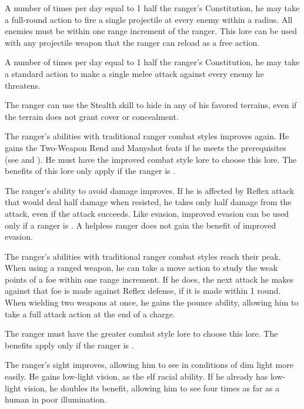  A number of times per day equal to 1 \add half the ranger's Constitution, he may take a full-round action to fire a single projectile at every enemy within a \areamed radius. All enemies must be within one range increment of the ranger. This lore can be used with any projectile weapon that the ranger can reload as a free action.

 A number of times per day equal to 1 \add half the ranger's Constitution, he may take a standard action to make a single melee attack against every enemy he threatens.

\label{Camouflage} The ranger can use the Stealth skill to hide in any of his favored terrains, even if the terrain does not grant cover or concealment.

 The ranger's abilities with traditional ranger combat styles improves again. He gains the Two-Weapon Rend and Manyshot feats if he meets the prerequisites (see  and ). He must have the improved combat style lore to choose this lore. The benefits of this lore only apply if the ranger is \unencumbered.

 The ranger's ability to avoid damage improves. If he is affected by Reflex attack that would deal half damage when resisted, he takes only half damage from the attack, even if the attack succeeds. Like evasion, improved evasion can be used only if a ranger is \unencumbered. A helpless ranger does not gain the benefit of improved evasion.

 The ranger's abilities with traditional ranger combat styles reach their peak. When using a ranged weapon, he can take a move action to study the weak points of a foe within one range increment. If he does, the next attack he makes against that foe is made against Reflex defense, if it is made within 1 round. When wielding two weapons at once, he gains the pounce ability, allowing him to take a full attack action at the end of a charge.

The ranger must have the greater combat style lore to choose this lore. The benefits apply only if the ranger is \unencumbered.

 The ranger's sight improves, allowing him to see in conditions of dim light more easily. He gains low-light vision, as the elf racial ability. If he already has low-light vision, he doubles its benefit, allowing him to see four times as far as a human in poor illumination.

